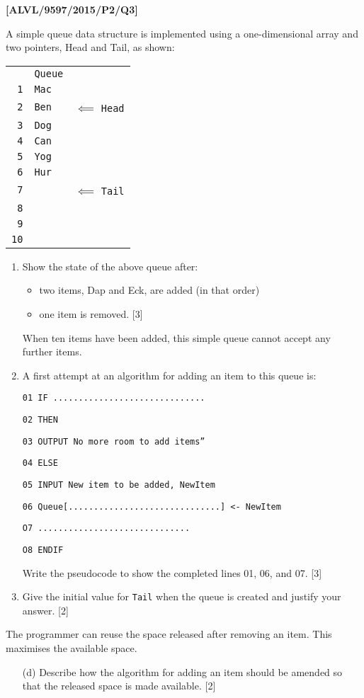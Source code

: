 \item \textbf{{[}ALVL/9597/2015/P2/Q3{]} }

A simple queue data structure is implemented using a one-dimensional
array and two pointers, Head and Tail, as shown:
\begin{center}
\begin{tabular}{r|l|l}
\multicolumn{1}{r}{} & \multicolumn{1}{l}{\texttt{Queue}} & \tabularnewline
\cline{2-2} 
\texttt{1} & \texttt{Mac} & \tabularnewline
\cline{2-2} 
\texttt{2} & \texttt{Ben} & $\impliedby$ \texttt{Head}\tabularnewline
\cline{2-2} 
\texttt{3} & \texttt{Dog} & \tabularnewline
\cline{2-2} 
\texttt{4} & \texttt{Can} & \tabularnewline
\cline{2-2} 
\texttt{5} & \texttt{Yog} & \tabularnewline
\cline{2-2} 
\texttt{6} & \texttt{Hur} & \tabularnewline
\cline{2-2} 
\texttt{7} &  & $\impliedby$ \texttt{Tail}\tabularnewline
\cline{2-2} 
\texttt{8} &  & \tabularnewline
\cline{2-2} 
\texttt{9} &  & \tabularnewline
\cline{2-2} 
\texttt{10} &  & \tabularnewline
\cline{2-2} 
\end{tabular}
\par\end{center}
\begin{enumerate}
\item Show the state of the above queue after: 
\begin{itemize}
\item two items, Dap and Eck, are added (in that order) 
\item one item is removed. \hfill{}{[}3{]}
\end{itemize}
When ten items have been added, this simple queue cannot accept any
further items. 
\item A first attempt at an algorithm for adding an item to this queue is:

\noindent\begin{minipage}[t]{1\columnwidth}%
\texttt{01 IF ..............................}

\texttt{02 \qquad{}THEN }

\texttt{03 \qquad{}\qquad{}OUTPUT \textquotedbl No more room to
add items\textquotedblright{} }

\texttt{04 \qquad{}ELSE }

\texttt{05 \qquad{}\qquad{}INPUT \textquotedbl New item to be added\textquotedbl ,
NewItem }

\texttt{06 \qquad{}\qquad{}Queue{[}..............................{]}
<- NewItem }

\texttt{O7 \qquad{}\qquad{}.............................. }

\texttt{O8 ENDIF }%
\end{minipage}

Write the pseudocode to show the completed lines 01, 06, and 07. \hfill{}{[}3{]}
\item Give the initial value for \texttt{Tail} when the queue is created
and justify your answer. \hfill{}{[}2{]}
\end{enumerate}
The programmer can reuse the space released after removing an item.
This maximises the available space.
\begin{enumerate}
\item[(d)]  Describe how the algorithm for adding an item should be amended
so that the released space is made available. \hfill{}{[}2{]}
\end{enumerate}
